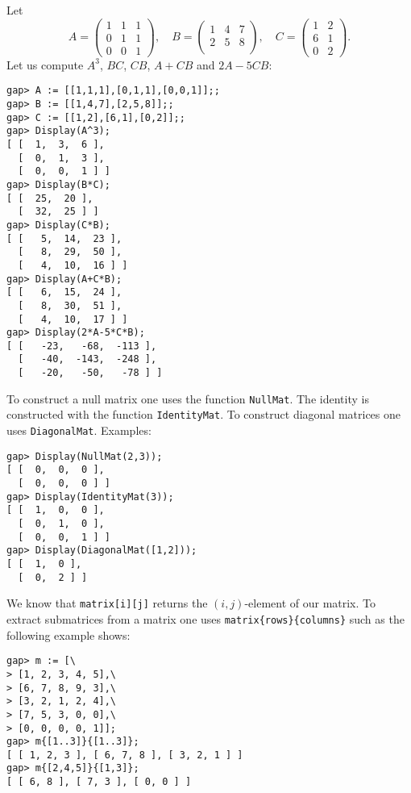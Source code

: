 \begin{example}
Let 
\[
A=\begin{pmatrix}
    1 & 1 & 1\\
    0 & 1 & 1\\
    0 & 0 & 1
\end{pmatrix},
\quad
B=\begin{pmatrix}
    1 & 4 & 7\\
    2 & 5 & 8\\
\end{pmatrix},
\quad
C=\begin{pmatrix}
    1 & 2\\
    6 & 1\\
    0 & 2
\end{pmatrix}.
\]
Let us compute $A^3$, $BC$, $CB$, $A+CB$ and $2A-5CB$: 
\begin{lstlisting}
gap> A := [[1,1,1],[0,1,1],[0,0,1]];;
gap> B := [[1,4,7],[2,5,8]];;
gap> C := [[1,2],[6,1],[0,2]];;
gap> Display(A^3);
[ [  1,  3,  6 ],
  [  0,  1,  3 ],
  [  0,  0,  1 ] ]
gap> Display(B*C);
[ [  25,  20 ],
  [  32,  25 ] ]
gap> Display(C*B);
[ [   5,  14,  23 ],
  [   8,  29,  50 ],
  [   4,  10,  16 ] ]
gap> Display(A+C*B);
[ [   6,  15,  24 ],
  [   8,  30,  51 ],
  [   4,  10,  17 ] ]
gap> Display(2*A-5*C*B);
[ [   -23,   -68,  -113 ],
  [   -40,  -143,  -248 ],
  [   -20,   -50,   -78 ] ]
\end{lstlisting}
\end{example}

To construct a null matrix one uses the function \lstinline{NullMat}. The
identity is constructed with the function \lstinline{IdentityMat}. To construct
diagonal matrices one uses \lstinline{DiagonalMat}. Examples:
\begin{lstlisting}
gap> Display(NullMat(2,3));
[ [  0,  0,  0 ],
  [  0,  0,  0 ] ]
gap> Display(IdentityMat(3));
[ [  1,  0,  0 ],
  [  0,  1,  0 ],
  [  0,  0,  1 ] ]
gap> Display(DiagonalMat([1,2]));
[ [  1,  0 ],
  [  0,  2 ] ]
\end{lstlisting}

We know that \lstinline{matrix[i][j]} returns the $(i,j)$-element of our matrix. 
To extract submatrices from a matrix one uses 
\lstinline|matrix{rows}{columns}| such as the following example shows:
\begin{lstlisting}
gap> m := [\
> [1, 2, 3, 4, 5],\
> [6, 7, 8, 9, 3],\
> [3, 2, 1, 2, 4],\
> [7, 5, 3, 0, 0],\
> [0, 0, 0, 0, 1]];
gap> m{[1..3]}{[1..3]};
[ [ 1, 2, 3 ], [ 6, 7, 8 ], [ 3, 2, 1 ] ]
gap> m{[2,4,5]}{[1,3]};
[ [ 6, 8 ], [ 7, 3 ], [ 0, 0 ] ]
\end{lstlisting}

